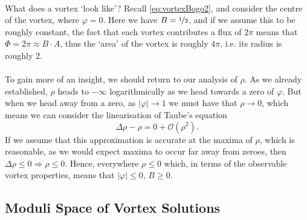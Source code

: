 \documentclass[11pt, fleqn]{article}
\begin{document}
\paragraph{} What does a vortex `look like'? Recall \eqref{eq:vortexBogo2}, and consider the centre of the vortex, where $ \varphi = 0 $. Here we have $ B = \nicefrac{1}{2} $, and if we assume this to be roughly constant, the fact that each vortex contributes a flux of $ 2 \pi $ means that $ \Phi = 2 \pi \approx B \cdot A $, thus the `area' of the vortex is roughly $ 4 \pi $, i.e. its radius is roughly $ 2 $.

\paragraph{} To gain more of an insight, we should return to our analysis of $ \rho $. As we already established, $ \rho $ heads to $ -\infty $ logarithmically as we head towards a zero of $ \varphi $. But when we head away from a zero, as $ |\varphi| \to 1 $ we must have that $ \rho \to 0 $, which means we can consider the linearisation of Taube's equation
	\begin{equation}\label{key}
		\Delta \rho - \rho = 0 + \mathcal{O}\left( \rho^2 \right).
	\end{equation}
If we assume that this approximation is accurate at the maxima of $ \rho $, which is reasonable, as we would expect maxima to occur far away from zeroes, then $ \Delta \rho \leq 0 \Rightarrow \rho \leq 0 $. Hence, everywhere $ \rho \leq 0 $ which, in terms of the observable vortex properties, means that $ |\varphi| \leq 0 $, $ B \geq 0 $.


\subsection{Moduli Space of Vortex Solutions}
\end{document}
